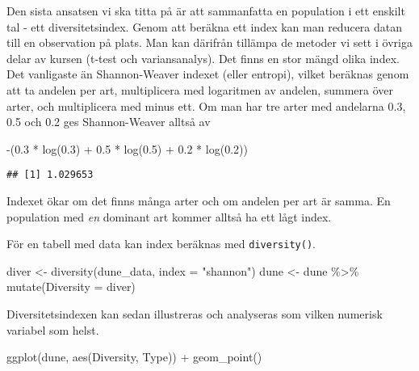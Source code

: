 \documentclass[
]{book}
\newenvironment{Shaded}{\begin{snugshade}}{\end{snugshade}}
\newcommand{\AttributeTok}[1]{\textcolor[rgb]{0.77,0.63,0.00}{#1}}
\newcommand{\FloatTok}[1]{\textcolor[rgb]{0.00,0.00,0.81}{#1}}
\newcommand{\FunctionTok}[1]{\textcolor[rgb]{0.00,0.00,0.00}{#1}}
\newcommand{\NormalTok}[1]{#1}
\newcommand{\OtherTok}[1]{\textcolor[rgb]{0.56,0.35,0.01}{#1}}
\newcommand{\SpecialCharTok}[1]{\textcolor[rgb]{0.00,0.00,0.00}{#1}}
\newcommand{\StringTok}[1]{\textcolor[rgb]{0.31,0.60,0.02}{#1}}
\theoremstyle{definition}
\theoremstyle{definition}
\theoremstyle{definition}
\theoremstyle{definition}
\theoremstyle{remark}
\begin{document}
Den sista ansatsen vi ska titta på är att sammanfatta en population i ett enskilt tal - ett diversitetsindex. Genom att beräkna ett index kan man reducera datan till en observation på plats. Man kan därifrån tillämpa de metoder vi sett i övriga delar av kursen (t-test och variansanalys). Det finns en stor mängd olika index. Det vanligaste än Shannon-Weaver indexet (eller entropi), vilket beräknas genom att ta andelen per art, multiplicera med logaritmen av andelen, summera över arter, och multiplicera med minus ett. Om man har tre arter med andelarna 0.3, 0.5 och 0.2 ges Shannon-Weaver alltså av

\begin{Shaded}
\begin{Highlighting}[]
\SpecialCharTok{{-}}\NormalTok{(}\FloatTok{0.3} \SpecialCharTok{*} \FunctionTok{log}\NormalTok{(}\FloatTok{0.3}\NormalTok{) }\SpecialCharTok{+} \FloatTok{0.5} \SpecialCharTok{*} \FunctionTok{log}\NormalTok{(}\FloatTok{0.5}\NormalTok{) }\SpecialCharTok{+} \FloatTok{0.2} \SpecialCharTok{*} \FunctionTok{log}\NormalTok{(}\FloatTok{0.2}\NormalTok{))}
\end{Highlighting}
\end{Shaded}

\begin{verbatim}
## [1] 1.029653
\end{verbatim}

Indexet ökar om det finns många arter och om andelen per art är samma. En population med \emph{en} dominant art kommer alltså ha ett lågt index.

För en tabell med data kan index beräknas med \texttt{diversity()}.

\begin{Shaded}
\begin{Highlighting}[]
\NormalTok{diver }\OtherTok{\textless{}{-}} \FunctionTok{diversity}\NormalTok{(dune\_data, }\AttributeTok{index =} \StringTok{"shannon"}\NormalTok{)}
\NormalTok{dune }\OtherTok{\textless{}{-}}\NormalTok{ dune }\SpecialCharTok{\%\textgreater{}\%} \FunctionTok{mutate}\NormalTok{(}\AttributeTok{Diversity =}\NormalTok{ diver)}
\end{Highlighting}
\end{Shaded}

Diversitetsindexen kan sedan illustreras och analyseras som vilken numerisk variabel som helst.

\begin{Shaded}
\begin{Highlighting}[]
\FunctionTok{ggplot}\NormalTok{(dune, }\FunctionTok{aes}\NormalTok{(Diversity, Type)) }\SpecialCharTok{+} \FunctionTok{geom\_point}\NormalTok{()}
\end{Highlighting}
\end{Shaded}
\end{document}
